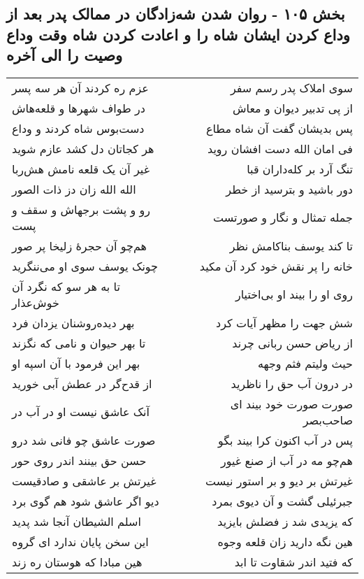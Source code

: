 \begin{center}
\section*{بخش ۱۰۵ - روان شدن شه‌زادگان در ممالک پدر بعد از وداع کردن ایشان شاه را و اعادت کردن شاه وقت وداع وصیت را الی آخره}
\label{sec:sh105}
\begin{longtable}{l p{0.5cm} r}
عزم ره کردند آن هر سه پسر
&&
سوی املاک پدر رسم سفر
\\
در طواف شهرها و قلعه‌هاش
&&
از پی تدبیر دیوان و معاش
\\
دست‌بوس شاه کردند و وداع
&&
پس بدیشان گفت آن شاه مطاع
\\
هر کجاتان دل کشد عازم شوید
&&
فی امان الله دست افشان روید
\\
غیر آن یک قلعه نامش هش‌ربا
&&
تنگ آرد بر کله‌داران قبا
\\
الله الله زان دز ذات الصور
&&
دور باشید و بترسید از خطر
\\
رو و پشت برجهاش و سقف و پست
&&
جمله تمثال و نگار و صورتست
\\
هم‌چو آن حجرهٔ زلیخا پر صور
&&
تا کند یوسف بناکامش نظر
\\
چونک یوسف سوی او می‌ننگرید
&&
خانه را پر نقش خود کرد آن مکید
\\
تا به هر سو که نگرد آن خوش‌عذار
&&
روی او را بیند او بی‌اختیار
\\
بهر دیده‌روشنان یزدان فرد
&&
شش جهت را مظهر آیات کرد
\\
تا بهر حیوان و نامی که نگزند
&&
از ریاض حسن ربانی چرند
\\
بهر این فرمود با آن اسپه او
&&
حیث ولیتم فثم وجهه
\\
از قدح‌گر در عطش آبی خورید
&&
در درون آب حق را ناظرید
\\
آنک عاشق نیست او در آب در
&&
صورت صورت خود بیند ای صاحب‌بصر
\\
صورت عاشق چو فانی شد درو
&&
پس در آب اکنون کرا بیند بگو
\\
حسن حق بینند اندر روی حور
&&
هم‌چو مه در آب از صنع غیور
\\
غیرتش بر عاشقی و صادقیست
&&
غیرتش بر دیو و بر استور نیست
\\
دیو اگر عاشق شود هم گوی برد
&&
جبرئیلی گشت و آن دیوی بمرد
\\
اسلم الشیطان آنجا شد پدید
&&
که یزیدی شد ز فضلش بایزید
\\
این سخن پایان ندارد ای گروه
&&
هین نگه دارید زان قلعه وجوه
\\
هین مبادا که هوستان ره زند
&&
که فتید اندر شقاوت تا ابد

\end{longtable}
\end{center}
